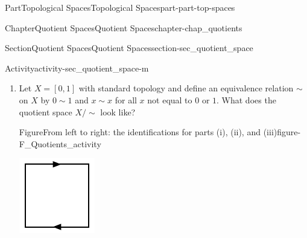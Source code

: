 \documentclass[oneside,10pt,]{book}
\numberwithin{equation}{chapter}
\newcommand{\ssim}{\sim}
\begin{document}
\begin{partptx}{Part}{Topological Spaces}{}{Topological Spaces}{}{}{part-part-top-spaces}
\begin{chapterptx}{Chapter}{Quotient Spaces}{}{Quotient Spaces}{}{}{chapter-chap_quotients}
\begin{sectionptx}{Section}{Quotient Spaces}{}{Quotient Spaces}{}{}{section-sec_quotient_space}
\begin{activity}{Activity}{}{activity-sec_quotient_space-m}
\begin{enumerate}[font=\bfseries,label=(\alph*),ref=\alph*]
\item{}Let \(X = [0, 1]\) with standard topology and define an equivalence relation \(\sim\) on \(X\) by \(0 \sim 1\) and \(x \sim x\) for all \(x\) not equal to \(0\) or \(1\). What does the quotient space \(X/\ssim\) look like?%
\begin{figureptx}{Figure}{From left to right: the identifications for parts (i), (ii), and (iii)}{figure-F_Quotients_activity}{}%
\begin{sidebyside}{3}{0}{0}{0}%
\begin{sbspanel}{0.333333333333333}%
\includegraphics[width=\linewidth]{external/Mobius_identification.pdf}
\end{sbspanel}%
\begin{sbspanel}{0.333333333333333}%

\end{sbspanel}
\end{sidebyside}
\end{figureptx}
\end{enumerate}
\end{activity}
\end{sectionptx}
\end{chapterptx}
\end{partptx}
\end{document}
